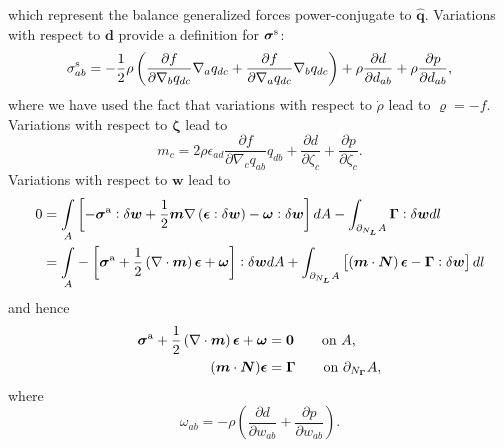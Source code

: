 which represent the balance generalized forces  power-conjugate to $\widehat{\bm{q}}$. Variations with respect to $\bm{d}$ provide a definition for $\bm{\sigma}^{\rm s}$:
\begin{equation} 
	\label{eq:sym_stress}
	\sigma^{\rm s}_{ab} = -\frac{1}{2}\rho \left(\frac{\partial  f}{\partial \nabla_b q_{dc}} \nabla_a q_{dc}+ \frac{\partial  f}{\partial \nabla_a q_{dc}} \nabla_b q_{dc}\right) + \rho \frac{\partial  d}{\partial d_{ab}}+ \rho \frac{\partial  p}{\partial d_{ab}},
\end{equation}
where we have used the fact that variations with respect to $\dot{\rho}$ lead to $\varrho  = -f$. Variations with respect to $\bm{\zeta}$ lead to
\begin{equation}
	\label{eq:moment}
	m_c = 2 \rho \epsilon_{ad} \frac{\partial  f}{\partial \nabla_c q_{ab}} q_{db} + \frac{\partial  d}{\partial \zeta_c} + \frac{\partial  p}{\partial \zeta_c}.
\end{equation}
Variations with respect to $\bm{w}$ lead to
\begin{equation}
	\begin{aligned}
		0&=\underset{A}{\int} \left[-\bm{\sigma}^{\rm a} :\delta\bm{w} + \frac{1}{2} \bm{m}  \nabla \left(\bm{\epsilon}:\delta\bm{w}\right) - \bm{\omega} :\delta \bm{w} \right] dA - \int_{\partial_{N_{\bm{L}}}A} \bm{\Gamma}:\delta\bm{w} dl \\
		&=\underset{A}{\int} -\left[\bm{\sigma}^{\rm a}  + \frac{1}{2} \left(\nabla \cdot \bm{m}\right) \bm{\epsilon} +  \bm{\omega}  \right] : \delta\bm{w} dA + \int_{\partial_{N_{\bm{L}}}A} \left[\left(\bm{m}\cdot\bm{N}\right) \bm{\epsilon}- \bm{\Gamma}:\delta\bm{w}\right] dl \\
	\end{aligned}
\end{equation}  
and hence 
\begin{equation}
	\label{eq:balance_angular_momentum}
	\begin{aligned}
		\bm{\sigma}^{\rm a} + \frac{1}{2}\left(\nabla\cdot\bm{m}\right)\bm{\epsilon} +  \bm{\omega} &= \bm{0} \qquad \text{on } A,\\
		(\bm{m}\cdot\bm{N})\bm{\epsilon} &= \bm{\Gamma} \qquad \text{on } \partial_{N_{\bm{\Gamma}}} A,\\
	\end{aligned}
\end{equation}
where 
\begin{equation}
	\omega_{ab} = - \rho \left(\frac{\partial  d}{\partial w_{ab}} + \frac{\partial  p}{\partial w_{ab}}\right).
\end{equation}
